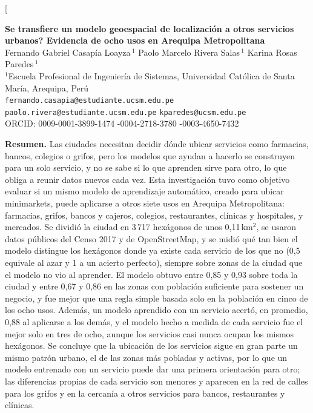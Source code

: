 \documentclass[10pt,letterpaper,twocolumn]{article}
\begin{document}
\twocolumn[{%
\begin{center}
{\LARGE\bfseries \textquestiondown{}Se transfiere un modelo geoespacial de localización a otros servicios urbanos? Evidencia de ocho usos en Arequipa Metropolitana}\\[1.1em]
{\large Fernando Gabriel Casapía Loayza\,$^{1}$ \quad Paolo Marcelo Rivera Salas\,$^{1}$ \quad Karina Rosas Paredes\,$^{1}$}\\[0.5em]
{\small $^{1}$Escuela Profesional de Ingeniería de Sistemas, Universidad Católica de Santa María, Arequipa, Perú}\\[0.3em]
{\small \texttt{fernando.casapia@estudiante.ucsm.edu.pe} \quad \texttt{paolo.rivera@estudiante.ucsm.edu.pe} \quad \texttt{kparedes@ucsm.edu.pe}}\\[0.3em]
{\footnotesize ORCID: 0009-0001-3899-1474 -0004-2718-3780 -0003-4650-7432}
\end{center}
\vspace{0.4em}
\begin{center}
\begin{minipage}{0.94\textwidth}
\small
\noindent\textbf{Resumen.}
Las ciudades necesitan decidir dónde ubicar servicios como farmacias, bancos, colegios o grifos, pero los modelos que ayudan a hacerlo se construyen para un solo servicio, y no se sabe si lo que aprenden sirve para otro, lo que obliga a reunir datos nuevos cada vez. Esta investigación tuvo como objetivo evaluar si un mismo modelo de aprendizaje automático, creado para ubicar minimarkets, puede aplicarse a otros siete usos en Arequipa Metropolitana: farmacias, grifos, bancos y cajeros, colegios, restaurantes, clínicas y hospitales, y mercados. Se dividió la ciudad en 3\,717 hexágonos de unos 0,11\,km$^2$, se usaron datos públicos del Censo 2017 y de OpenStreetMap, y se midió qué tan bien el modelo distingue los hexágonos donde ya existe cada servicio de los que no (0,5 equivale al azar y 1 a un acierto perfecto), siempre sobre zonas de la ciudad que el modelo no vio al aprender. El modelo obtuvo entre 0,85 y 0,93 sobre toda la ciudad y entre 0,67 y 0,86 en las zonas con población suficiente para sostener un negocio, y fue mejor que una regla simple basada solo en la población en cinco de los ocho usos. Además, un modelo aprendido con un servicio acertó, en promedio, 0,88 al aplicarse a los demás, y el modelo hecho a medida de cada servicio fue el mejor solo en tres de ocho, aunque los servicios casi nunca ocupan los mismos hexágonos. Se concluye que la ubicación de los servicios sigue en gran parte un mismo patrón urbano, el de las zonas más pobladas y activas, por lo que un modelo entrenado con un servicio puede dar una primera orientación para otro; las diferencias propias de cada servicio son menores y aparecen en la red de calles para los grifos y en la cercanía a otros servicios para bancos, restaurantes y clínicas.


\end{minipage}
\end{center}}
\end{document}
